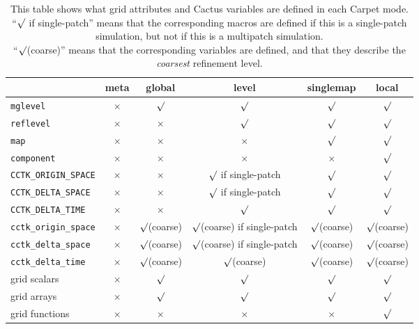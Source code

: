 \documentclass{article}
\begin{document}
\begin{table}[bp]
\def\yes{$\surd$}
\def\no{$\times$}
\begin{center}
\begin{tabular}{|lccccc|}
\hline %
				&meta	&global	&level	&singlemap
								&local	\\
\hline %
\texttt{mglevel}		&\no	&\yes	&\yes	&\yes	&\yes	\\
\texttt{reflevel}		&\no	&\no	&\yes	&\yes	&\yes	\\
\texttt{map}			&\no	&\no	&\no	&\yes	&\yes	\\
\texttt{component}		&\no	&\no	&\no	&\no	&\yes	\\
\hline %
\texttt{CCTK\_ORIGIN\_SPACE}	&\no	&\no	&\yes{} if single-patch
							&\yes	&\yes	\\
\texttt{CCTK\_DELTA\_SPACE}	&\no	&\no	&\yes{} if single-patch
							&\yes	&\yes	\\
\texttt{CCTK\_DELTA\_TIME}	&\no	&\no	&\yes
							&\yes	&\yes	\\
\texttt{cctk\_origin\_space}	&\no	&\yes (coarse)
						&\yes (coarse) if single-patch
							&\yes (coarse)
								&\yes (coarse)
									\\
\texttt{cctk\_delta\_space}	&\no	&\yes (coarse)
						&\yes (coarse) if single-patch
							&\yes (coarse)
								&\yes (coarse)
									\\
\texttt{cctk\_delta\_time}	&\no	&\yes (coarse)
						&\yes (coarse)
							&\yes (coarse)
								&\yes (coarse)
									\\
\hline %
grid scalars			&\no	&\yes	&\yes	&\yes	&\yes	\\
grid arrays			&\no	&\yes	&\yes	&\yes	&\yes	\\
grid functions			&\no	&\no	&\no	&\no	&\yes	\\
\hline %
\end{tabular}
\end{center}
\caption[What Carpet Defines in Each Mode]
	{
	This table shows what grid attributes and Cactus variables
	are defined in each Carpet mode.				\\
	``\yes{} if single-patch'' means that the corresponding macros
	are defined if this is a single-patch simulation, but not if
	this is a multipatch simulation.				\\
	``\yes (coarse)'' means that the corresponding variables are
	defined, and that they describe the \emph{coarsest} refinement
	level.								%
	}
\label{tab-what-Carpet-defines-in-each-mode}
\end{table}
\end{document}
